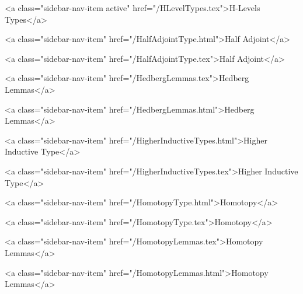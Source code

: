       
        
          <a class="sidebar-nav-item active" href="/HLevelTypes.tex">H-Levels Types</a>
        
      
    
      
        
          <a class="sidebar-nav-item" href="/HalfAdjointType.html">Half Adjoint</a>
        
      
    
      
        
          <a class="sidebar-nav-item" href="/HalfAdjointType.tex">Half Adjoint</a>
        
      
    
      
        
          <a class="sidebar-nav-item" href="/HedbergLemmas.tex">Hedberg Lemmas</a>
        
      
    
      
        
          <a class="sidebar-nav-item" href="/HedbergLemmas.html">Hedberg Lemmas</a>
        
      
    
      
        
          <a class="sidebar-nav-item" href="/HigherInductiveTypes.html">Higher Inductive Type</a>
        
      
    
      
        
          <a class="sidebar-nav-item" href="/HigherInductiveTypes.tex">Higher Inductive Type</a>
        
      
    
      
        
          <a class="sidebar-nav-item" href="/HomotopyType.html">Homotopy</a>
        
      
    
      
        
          <a class="sidebar-nav-item" href="/HomotopyType.tex">Homotopy</a>
        
      
    
      
        
          <a class="sidebar-nav-item" href="/HomotopyLemmas.tex">Homotopy Lemmas</a>
        
      
    
      
        
          <a class="sidebar-nav-item" href="/HomotopyLemmas.html">Homotopy Lemmas</a>
        
